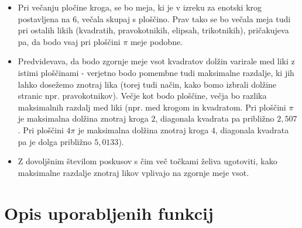 \documentclass[a4paper]{report}
\begin{document}
\begin{itemize}
\item Pri večanju pločine kroga, se bo meja, ki je v izreku za enotski krog postavljena na $6$, večala skupaj s ploščino. Prav tako se bo večala meja tudi pri ostalih likih (kvadratih, pravokotnikih, elipsah, trikotnikih), pričakujeva pa, da bodo vsaj pri ploščini $\pi$ meje podobne. \item Predvidevava, da bodo zgornje meje vsot kvadratov dolžin varirale med liki z istimi ploščinami - verjetno bodo pomembne tudi maksimalne razdalje, ki jih lahko dosežemo znotraj lika (torej tudi način, kako bomo izbrali dolžine stranic npr. pravokotnikov). Večje kot bodo ploščine, večja bo razlika maksimalnih razdalj med liki (npr. med krogom in kvadratom. Pri ploščini $\pi$ je maksimalna dolžina znotraj kroga $2$, diagonala kvadrata pa približno $2,507$. Pri ploščini $4\pi$ je maksimalna dolžina znotraj kroga $4$, diagonala kvadrata pa je dolga približno $5,0133$). 
\item Z dovoljšnim številom poskusov s čim več točkami želiva ugotoviti, kako maksimalne razdalje znotraj likov vplivajo na zgornje meje vsot. 
\end{itemize}


\section{Opis uporabljenih funkcij}
\end{document}
